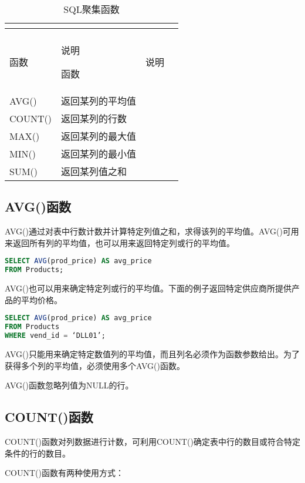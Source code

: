 \begin{longtable}{|m{180pt}|m{180pt}|}
\hline
{}
\tabularnewline\hline
\endhead

\caption{SQL聚集函数}\\
\hline
函数	&说明
\endfirsthead

\endfoot

\endlastfoot
\hline
函数	&说明\\
\hline
AVG()	&返回某列的平均值\\
\hline
COUNT()&返回某列的行数\\
\hline
MAX()	&返回某列的最大值\\
\hline
MIN()	&返回某列的最小值\\
\hline
SUM()	&返回某列值之和\\
\hline
\end{longtable}


\subsection{AVG()函数}

AVG()通过对表中行数计数并计算特定列值之和，求得该列的平均值。AVG()可用来返回所有列的平均值，也可以用来返回特定列或行的平均值。

\begin{lstlisting}[language=SQL]
SELECT AVG(prod_price) AS avg_price
FROM Products;
\end{lstlisting}

AVG()也可以用来确定特定列或行的平均值。下面的例子返回特定供应商所提供产品的平均价格。

\begin{lstlisting}[language=SQL]
SELECT AVG(prod_price) AS avg_price
FROM Products
WHERE vend_id = ‘DLL01’;
\end{lstlisting}

AVG()只能用来确定特定数值列的平均值，而且列名必须作为函数参数给出。为了获得多个列的平均值，必须使用多个AVG()函数。

AVG()函数忽略列值为NULL的行。
\subsection{COUNT()函数}

COUNT()函数对列数据进行计数，可利用COUNT()确定表中行的数目或符合特定条件的行的数目。

COUNT()函数有两种使用方式：

